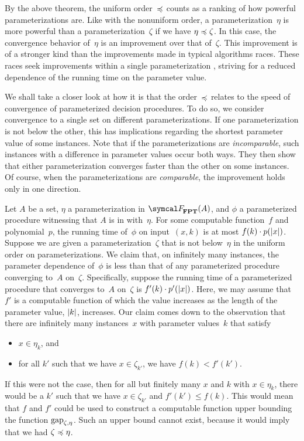 By the above theorem, the uniform order~$\preccurlyeq$ counts as a ranking of how powerful parameterizations are.
Like with the nonuniform order, a parameterization~$\eta$ is more powerful than a parameterization~$\zeta$ if we have $\eta \preccurlyeq \zeta$.
In this case, the convergence behavior of~$\eta$ is an improvement over that of~$\zeta$.
This improvement is of a stronger kind than the improvements made in typical algorithms races.
These races seek improvements within a single parameterization \parencite{komusiewicz2012new,fellows2013towards}, striving for a reduced dependence of the running time on the parameter value.
\begin{example}
  We shall take a closer look at how it is that the order~$\preccurlyeq$ relates to the speed of convergence of parameterized decision procedures.
  To do so, we consider convergence to a single set on different parameterizations.
  If one parameterization is not below the other, this has implications regarding the shortest parameter value of some instances.
  Note that if the parameterizations are \emph{incomparable}, such instances with a difference in parameter values occur both ways.
  They then show that either parameterization converges faster than the other on some instances.
  Of course, when the parameterizations are \emph{comparable}, the improvement holds only in one direction.

  Let $A$ be a set, $\eta$ a parameterization in $\calF_\cl{FPT}(A)$, and $\phi$ a parameterized procedure witnessing that $A$ is in  with~$\eta$.
  For some computable function~$f$ and polynomial~$p$, the running time of~$\phi$ on input~$(x, k)$ is at most $f(k) \cdot p({\lvert x\rvert})$.
  Suppose we are given a parameterization~$\zeta$ that is not below~$\eta$ in the uniform order on parameterizations.
  We claim that, on infinitely many instances, the parameter dependence of~$\phi$ is less than that of any parameterized procedure converging to~$A$ on~$\zeta$.
  Specifically, suppose the running time of a parameterized procedure that converges to~$A$ on~$\zeta$ is $f'(k) \cdot p'({\lvert x\rvert})$.
  Here, we may assume that $f'$ is a computable function of which the value increases as the length of the parameter value, ${\lvert k\rvert}$, increases.
  Our claim comes down to the observation that there are infinitely many instances~$x$ with parameter values~$k$ that satisfy
  \begin{itemize}
  \item $x \in \eta_k$, and
  \item for all $k'$ such that we have $x \in \zeta_{k'}$, we have $f(k) < f'(k')$.
  \end{itemize}
  If this were not the case, then for all but finitely many $x$ and $k$ with $x \in \eta_k$, there would be a $k'$ such that we have $x \in \zeta_{k'}$ and $f'(k') \le f(k)$.
  This would mean that $f$ and $f'$ could be used to construct a computable function upper bounding the function $\operatorname{gap}_{\zeta, \eta}$.
  Such an upper bound cannot exist, because it would imply that we had $\zeta \preccurlyeq \eta$.
\end{example}

